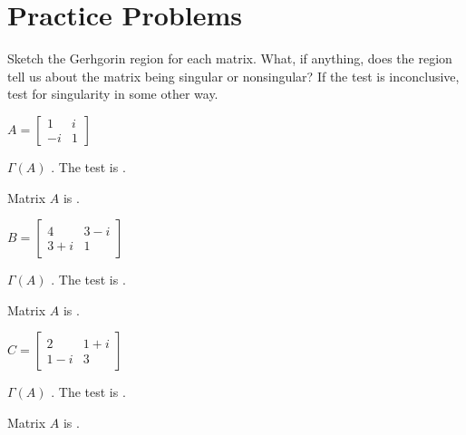 \documentclass{ximera}
\begin{document}
\section*{Practice Problems}

\begin{problem}
    Sketch the Gerhgorin region for each matrix.  What, if anything, does the region tell us about the matrix being singular or nonsingular?  If the test is inconclusive, test for singularity in some other way.

\begin{problem}\label{prob:Gersh1}
$A = \left[ \begin{array}{rr}
1 & i\\
-i & 1
\end{array}\right]$

\begin{prompt}
$\Gamma (A)$ .  The test is .
\end{prompt}
\begin{problem}
Matrix $A$ is .
\end{problem}
\end{problem}

\begin{problem}\label{prob:Gersh2}
$B = \left[ \begin{array}{cc}
4 & 3 - i \\
3 + i & 1
\end{array}\right]$

\begin{prompt}
$\Gamma (A)$ .  The test is .
\end{prompt}
\begin{problem}
Matrix $A$ is .
\end{problem}
\end{problem}

\begin{problem}\label{prob:Gersh3}
$C = \left[ \begin{array}{cc}
2 & 1 + i\\
1 - i & 3
\end{array}\right]$

\begin{prompt}
$\Gamma (A)$ .  The test is .
\end{prompt}
\begin{problem}
Matrix $A$ is .
\end{problem}
\end{problem}


\end{problem}
\end{document}
